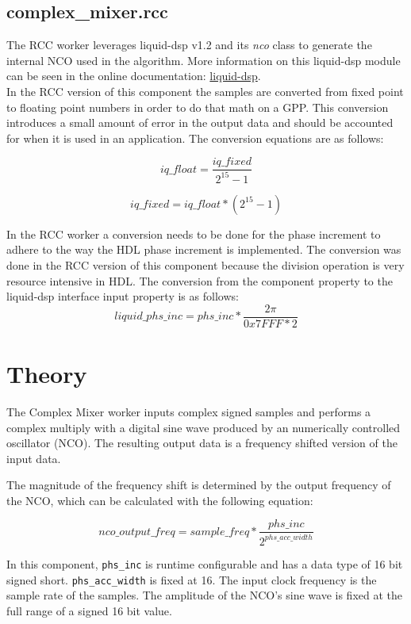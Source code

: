 \documentclass{article}
\def\comp{complex\_mixer}
\begin{document}
\subsection*{\comp.rcc}
\begin{flushleft}
	The RCC worker leverages liquid-dsp v1.2 and its \textit{nco} class to generate the internal NCO used in the algorithm. More information on this liquid-dsp module can be seen in the online documentation: \href{http://liquidsdr.org/doc/nco/}{liquid-dsp}.  \\
	In the RCC version of this component the samples are converted from fixed point to floating point numbers in order to do that math on a GPP. This conversion introduces a small amount of error in the output data and should be accounted for when it is used in an application.  The conversion equations are as follows:

	\begin{equation} \label{eq:iq_float}
  		iq\_float = \frac{iq\_fixed}{2^{15} -1}
	\end{equation}

    \begin{equation} \label{eq:iq_fixed}
  		iq\_fixed = {iq\_float}*(2^{15} -1)
	\end{equation}

	In the RCC worker a conversion needs to be done for the phase increment to adhere to the way the HDL phase increment is implemented.  The conversion was done in the RCC version of this component because the division operation is very resource intensive in HDL.  The conversion from the component property to the liquid-dsp interface input property is as follows:
	\begin{equation} \label{eq:rcc_phase_inc}
  		liquid\_phs\_inc = phs\_inc*\frac{2\pi}{0x7FFF*2}
	\end{equation}
\end{flushleft}

\section*{Theory}
\begin{flushleft}
	The Complex Mixer worker inputs complex signed samples and performs a complex multiply with a digital sine wave produced by an numerically controlled oscillator (NCO). The resulting output data is a frequency shifted version of the input data.\medskip

	The magnitude of the frequency shift is determined by the output frequency of the NCO, which can be calculated with the following equation:

	\begin{equation} \label{eq:nco_output_freq}
		nco\_output\_freq = sample\_freq*\frac{phs\_inc}{2^{phs\_acc\_width}}
	\end{equation}

	In this component, \verb+phs_inc+ is runtime configurable and has a data type of 16 bit signed short. \verb+phs_acc_width+ is fixed at 16. The input clock frequency is the sample rate of the samples. The amplitude of the NCO's sine wave is fixed at the full range of a signed 16 bit value.
\end{flushleft}
\end{document}
